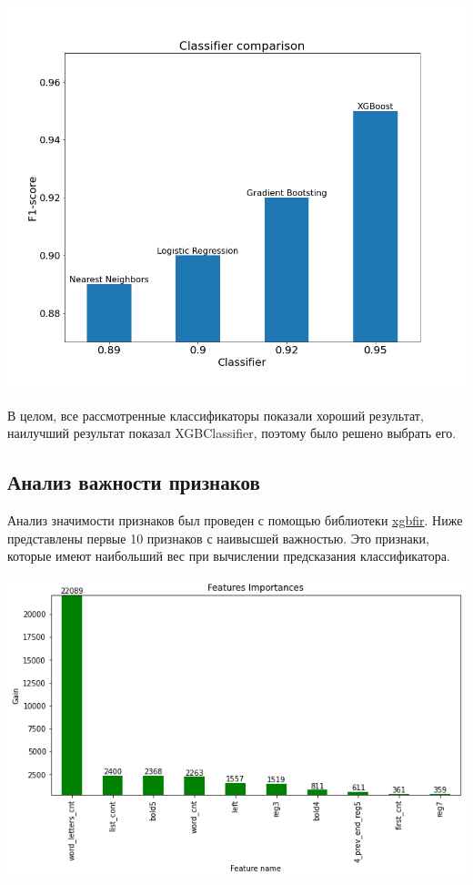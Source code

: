 \documentclass[a4paper,12pt]{article}
\begin{document}
\begin{center}
	\includegraphics[width=1.0\textwidth]{pics/scores.png}
\end{center}

В целом, все рассмотренные классификаторы показали хороший результат, наилучший результат показал XGBClassifier, поэтому было решено выбрать его.

\subsection{Анализ важности признаков}

Анализ значимости признаков был проведен с помощью библиотеки \href{https://github.com/limexp/xgbfir}{xgbfir}.
Ниже представлены первые 10 признаков с наивысшей важностью. Это признаки, которые имеют наибольший вес при вычислении предсказания классификатора.

\begin{center}
	\includegraphics[width=1.0\textwidth]{pics/gaines.png}
\end{center}
\end{document}
